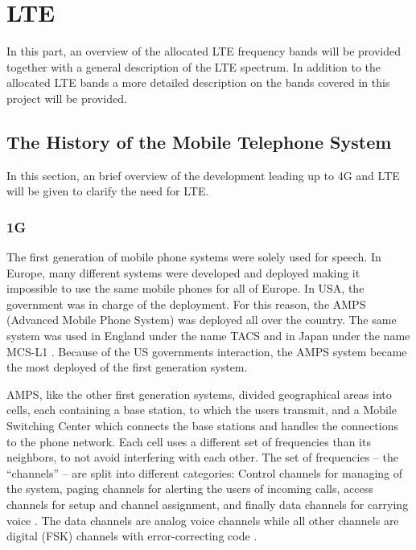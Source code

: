 \section{LTE}
\label{sec:lte}
\begin{aautop}
    In this part, an overview of the allocated LTE frequency bands will be provided together with a general description of the LTE spectrum.
    In addition to the allocated LTE bands a more detailed description on the bands covered in this project will be provided.
\end{aautop}

\subsection{The History of the Mobile Telephone System}
In this section, an brief overview of the development leading up to 4G and LTE will be given to clarify the need for LTE.

\subsubsection{1G}
The first generation of mobile phone systems were solely used for speech. In Europe, many different systems were developed and deployed \cite{ramjee1998universal} making it impossible to use the same mobile phones for all of Europe. In USA, the government was in charge of the deployment. For this reason, the AMPS (Advanced Mobile Phone System) was deployed all over the country. The same system was used in England under the name TACS and in Japan under the name MCS-L1 \cite{tanenbaum2012computer}. Because of the US governments interaction, the AMPS system became the most deployed of the first generation system.

AMPS, like the other first generation systems, divided geographical areas into cells, each containing a base station, to which the users transmit, and a Mobile Switching Center which connects the base stations and handles the connections to the phone network. Each cell uses a different set of frequencies than its neighbors, to not avoid interfering with each other. The set of frequencies -- the ``channels'' -- are split into different categories: Control channels for managing of the system, paging channels for alerting the users of incoming calls, access channels for setup and channel assignment, and finally data channels for carrying voice \cite{tanenbaum2012computer}. The data channels are analog voice channels while all other channels are digital (FSK) channels with error-correcting code \cite{tanenbaum2012computer}.

